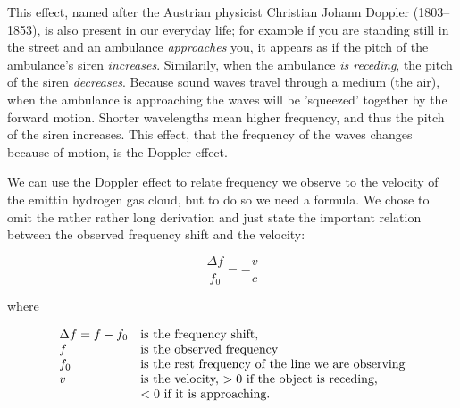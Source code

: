This effect, named after the Austrian physicist Christian Johann Doppler
(1803--1853), is also present in our everyday life; for example if you are
standing still in the street and an ambulance {\em approaches} you, it appears
as if the pitch of the ambulance's siren {\em increases}. Similarily, when the
ambulance {\em is receding}, the pitch of the siren {\em decreases}. Because
sound waves travel through a medium (the air), when the ambulance is
approaching the waves will be 'squeezed' together by the forward motion.
Shorter wavelengths mean higher frequency, and thus the pitch of the siren
increases. This effect, that the frequency of the waves changes because of
motion, is the Doppler effect. 

We can use the Doppler effect to relate frequency we observe to the velocity of
the emittin hydrogen gas cloud, but to do so we need a formula. We chose to omit
the rather rather long derivation and just state the important relation between
the observed frequency shift and the velocity:

\begin{equation}
{\boxed{
\frac{\Delta f}{f_0}=-\frac{v}{c}
}}
\end{equation}

where 

\begin{displaymath}
\begin{array}{ll}
\Delta f=f-f_0	&\hbox{is the frequency shift}, 	\\
f		&\hbox{is the observed frequency} 	\\
f_0		&\hbox{is
the rest frequency of the line we are observing}	\\
v		&\hbox{is the velocity, $> 0$ if the object is
receding,}						\\
		&\hbox{$< 0$ if it is approaching.}
\end{array}
\end{displaymath}

